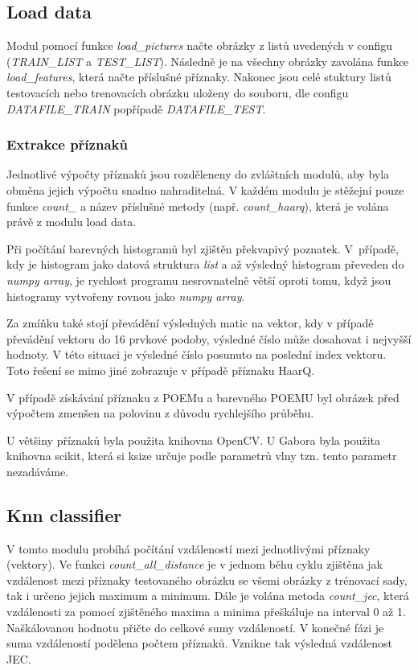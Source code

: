 \documentclass[czech,BP]{thesiskiv}
\begin{document}
\subsection{Load data}
\par Modul pomocí funkce \textit{load\_pictures} načte obrázky z listů uvedených v configu (\textit{TRAIN\_LIST} a \textit{TEST\_LIST}). Následně je na všechny obrázky zavolána funkce \textit{load\_features}, která načte příslušné příznaky. Nakonec jsou celé stuktury listů testovacích nebo trenovacích obrázku uloženy do souboru, dle configu \textit{DATAFILE\_TRAIN} popřípadě \textit{DATAFILE\_TEST}.


\subsubsection{Extrakce příznaků}
\par Jednotlivé výpočty příznaků jsou rozděleneny do zvláštních modulů, aby byla obměna jejich výpočtu snadno nahraditelná. V každém modulu je stěžejní pouze funkce \textit{count\_} a název příslušné metody (např. \textit{count\_haarq}), která je volána právě z modulu load data.

\par Při počítání barevných histogramů byl zjištěn překvapivý poznatek. V~případě, kdy je histogram jako datová struktura \textit{list} a až výsledný histogram převeden do \textit{numpy array}, je rychlost programu nesrovnatelně větší oproti tomu, když jsou histogramy vytvořeny rovnou jako \textit{numpy array}.  

\par Za zmíňku také stojí převádění výsledných matic na vektor, kdy v případě převádění vektoru do 16 prvkové podoby, výsledné číslo může dosahovat i nejvyšší hodnoty. V této situaci je výsledné číslo posunuto na poslední index vektoru. Toto řešení se mimo jiné zobrazuje v případě příznaku HaarQ. 

\par V případě získávání příznaku z POEMu a barevného POEMU byl obrázek před výpočtem zmenšen na polovinu z důvodu rychlejšího průběhu.

\par U většiny příznaků byla použita knihovna OpenCV. U Gabora byla použita knihovna scikit, která si ksize určuje podle parametrů vlny tzn. tento parametr nezadáváme.
   
  
\subsection{Knn classifier}
\par V tomto modulu probíhá počítání vzdáleností mezi jednotlivými příznaky (vektory). Ve funkci \textit{count\_all\_distance} je v jednom běhu cyklu zjištěna jak vzdálenost mezi příznaky testovaného obrázku se všemi obrázky z trénovací sady, tak i určeno jejich maximum a minimum. Dále je volána metoda \textit{count\_jec}, která vzdálenosti za pomocí zjištěného maxima a minima přeškáluje na interval 0 až 1. Naškálovanou hodnotu přičte do celkové sumy vzdáleností. V konečné fázi je suma vzdáleností podělena počtem příznaků. Vznikne tak výsledná vzdálenost JEC.
    
\end{document}

